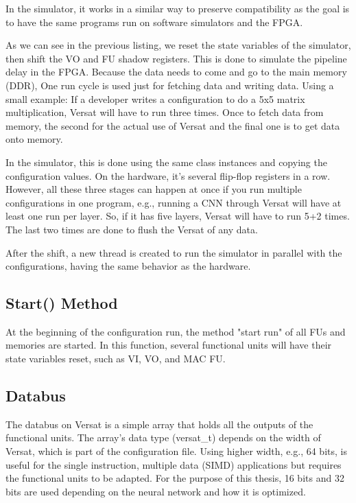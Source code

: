 In the simulator, it works in a similar way to preserve compatibility 
as the goal is to have the same
programs run on software simulators and the FPGA.



As we can see in the previous listing, we reset the state variables of the simulator, then shift the VO and FU shadow registers.
This is done to simulate the pipeline delay in the FPGA. 
Because the data needs to come and go to the main memory (DDR),
One run cycle is used just for fetching data and writing data. 
Using a small example:
If a developer writes a configuration to do a 5x5 matrix multiplication, 
Versat will have to run three times.
Once to fetch data from memory, the second for the actual use of Versat 
and the final one is to get data onto memory.

In the simulator, this is done using the same class instances and 
copying the configuration values. On the hardware, it's several flip-flop registers in a row.
However, all these three stages can happen at once if you run multiple configurations in one program, e.g., running a CNN
through Versat will have at least one run per layer. 
So, if it has five layers, Versat will have to run 5+2 times. The last two times are done to
flush the Versat of any data.

After the shift, a new thread is created to run the simulator in parallel 
with the configurations,
having the same behavior as the hardware.

\subsection{Start() Method}

At the beginning of the configuration run, the method "start run" of 
all FUs and memories are started.
In this function, several functional units will have their state variables reset, such as VI, VO, and MAC FU.

\subsection{Databus}

The databus on Versat is a simple array that holds all the outputs of the functional units.
The array's data type (versat\_t) depends on the width of Versat, which is part of the configuration file.
Using higher width, e.g., 64 bits, is useful for the single instruction, multiple data (SIMD) 
applications but requires the functional units to be adapted.
For the purpose of this thesis, 16 bits and 32 bits are used depending 
on the neural network and how it is optimized.


